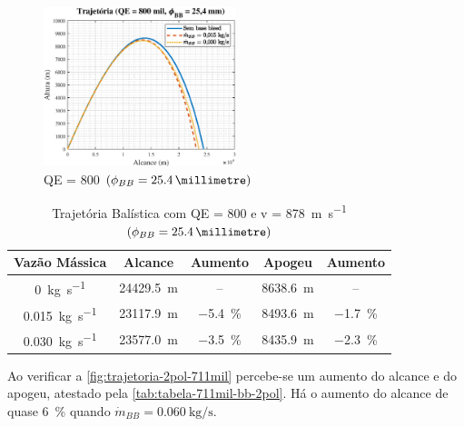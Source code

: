 \begin{figure}[!ht]
	\centering
    \includegraphics[width=0.5\textwidth]{foto2-qe800mil-1pol.eps}
    \caption[QE = \qty{800}{\milliradian} \(\left(\phi_{BB} = \qty{25,4}{\millimetre}\right)\)]{QE = \qty{800}{\milliradian} \(\left(\phi_{BB} = \qty{25,4}{\millimetre}\right)\)}
    \label{fig:trajetoria-1pol-800mil}
\end{figure}

\begin{table}[ht]
\centering
\caption[Trajetória Balística com QE = \qty{800}{\milliradian} e v = \qty{878}{\metre\per\second} \(\left(\phi_{BB} = \qty{25,4}{\millimetre}\right)\)]{Trajetória Balística com QE = \qty{800}{\milliradian} e v = \qty{878}{\metre\per\second} \(\left(\phi_{BB} = \qty{25,4}{\millimetre}\right)\)}
\vspace{0.5cm}
\begin{tabular}{c|c|c|c|c}
Vazão Mássica & Alcance & Aumento & Apogeu & Aumento \\
\hline
\qty{0}{\kilogram\per\second} & \qty{24429,5}{\metre} & -- & \qty{8638,6}{\metre} & -- \\ 
\qty{0,015}{\kilogram\per\second} & \qty{23117,9}{\metre} & \qty{-5,4}{\percent} & \qty{8493,6}{\metre} & \qty{-1,7}{\percent} \\
\qty{0,030}{\kilogram\per\second} & \qty{23577,0}{\metre} & \qty{-3,5}{\percent} & \qty{8435,9}{\metre} & \qty{-2,3}{\percent}
\end{tabular}
\label{tab:tabela-800mil-bb-1pol}
\end{table}

Ao verificar a \autoref{fig:trajetoria-2pol-711mil} percebe-se um aumento do alcance e do apogeu, atestado pela \autoref{tab:tabela-711mil-bb-2pol}. Há o aumento do alcance de quase \qty{6}{\percent} quando \(\Dot{m}_{BB} = \qty{0,060}{\kilogram\per\second}\).

